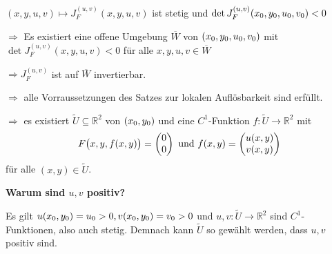 \documentclass{scrreprt}
\begin{document}
\begin{enumerate}[a)]
  $(x, y, u, v) \mapsto J_F^{(u, v)} (x, y, u, v)$ ist stetig und
  $\det J_F^{(u, v)} \qty(x_0, y_0, u_0, v_0) < 0$

  $\Rightarrow$ Es existiert eine offene Umgebung $\overline{W}$ von
  $\qty(x_0, y_0, u_0, v_0)$ mit $\det J_F^{(u, v)} (x, y, u, v) < 0$
  für alle $x, y, u, v \in \overline{W}$

  $\Rightarrow J_F^{(u,v)}$ ist auf $\overline{W}$ invertierbar.

  $\Rightarrow$ alle Vorraussetzungen des Satzes zur lokalen Auflösbarkeit sind
  erfüllt.

  $\Rightarrow$ es existiert $\tilde{U} \subseteq \mathbb{R}^2$ von $\qty(x_0, y_0)$
  und eine $C^1$-Funktion $f \colon \tilde{U} \to \mathbb{R}^2$ mit
  \[
    F\qty\big(x, y, f(x, y)) = \begin{pmatrix}
      0 \\
      0
    \end{pmatrix}
    \text{ und }
    f(x, y) = \begin{pmatrix}
      u(x, y) \\
      v(x, y)
    \end{pmatrix}
  \]
  für alle $(x, y) \in \tilde{U}$.

  \textbf{Warum sind $u, v$ positiv?}

  Es gilt $u\qty(x_0, y_0) = u_0 > 0, v\qty(x_0, y_0) = v_0 > 0$
  und $u, v \colon \tilde{U} \to \mathbb{R}^2$ sind $C^1$-Funktionen,
  also auch stetig.
  Demnach kann $\tilde{U}$ so gewählt werden, dass $u, v$ positiv sind.
\end{enumerate}
\end{document}
